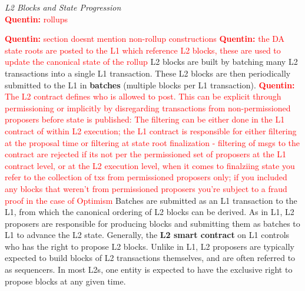 \documentclass[a4paper]{article}
\theoremstyle{boldstyle}
\newcommand{\qb}[1]{\textcolor{red}{\textbf{Quentin:} #1}}
\newcommand{\todoqb}[1]{\todo[color=red!40]{\textbf{Quentin:} #1}}
\begin{document}
    \textit{L2 Blocks and State Progression} \\
    \qb{rollups }



    
    \qb{section doesnt mention non-rollup constructions}
    \qb{the DA state roots are posted to the L1 which reference L2 blocks, these are used to update the canonical state of the rollup}
    L2 blocks are built by batching many L2 transactions into a single L1 transaction. These L2 blocks are then periodically submitted to the L1 in \textbf{batches} (multiple blocks per L1 transaction). 
    \qb{The L2 contract defines who is allowed to post. This can be explicit through permissioning or implicitly by disregarding transactions from non-permissioned proposers before state is published: The filtering can be either done in the L1 contract of within L2 execution; the L1 contract is responsible for either filtering at the proposal time or filtering at state root finalization - filtering of msgs to the contract are rejected if its not per the permissioned set of proposers at the L1 contract level, or at the L2 execution level, when it comes to finalziing state you refer to the collection of txs from permissioned proposers only; if you included any blocks that weren't from permissioned proposers you're subject to a fraud proof in the case of Optimism}
    Batches are submitted as an L1 transaction to the L1, from which the canonical ordering of L2 blocks can be derived. As in L1, L2 proposers are responsible for producing blocks and submitting them as batches to L1 to advance the L2 state. Generally, the \textbf{L2 smart contract} on L1 controls who has the right to propose L2 blocks. \todoqb{refine preceding sentence} Unlike in L1, L2 proposers are typically expected to build blocks of L2 transactions themselves, and are often referred to as sequencers. In most L2s, one entity is expected to have the exclusive right to propose blocks at any given time. 
    \\
    
\end{document}
